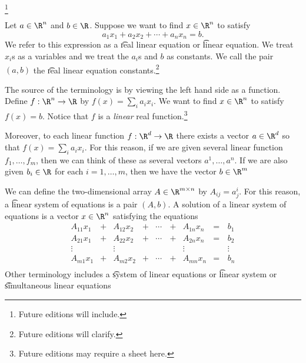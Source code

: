 
\footnote{Future editions will include.}


Let $a \in \R^n$ and $b \in \R$.
Suppose we want to find $x \in \R^n$ to satisfy
\[
  a_1x_1 + a_2x_2 + \cdots + a_nx_n = b.
\]
We refer to this expression as a \t{real linear equation} or \t{linear equation}.
We treat $x_i$s as a variables and we treat the $a_i$s and $b$ as constants.
We call the pair $(a, b)$ the \t{real linear equation constants}.\footnote{Future editions will clarify.}

The source of the terminology  is by viewing the left hand side as a function.
Define $f: \R^n \to \R$ by $f(x) = \sum_{i}a_ix_i$.
We want to find $x \in \R^n$ to satisfy $f(x) = b$.
Notice that $f$ is a \textit{linear} real function.\footnote{Future editions may require a sheet here.}

Moreover, to each linear function $f: \R^d \to \R$ there exists a vector $a \in \R^d$ so that $f(x) = \sum_{i} a_ix_i$.
For this reason, if we are given several linear function $f_1, \dots, f_m$, then we can think of these as several vectors $a^1, \dots, a^n$.
If we are also given $b_i \in \R$ for each $i = 1, \dots, m$, then we have the vector $b \in \R^m$

We can define the two-dimensional array $A \in \R^{m \times n}$ by $A_{ij} = a^{i}_j$.
For this reason, a \t{linear system of equations} is a pair $(A, b)$.
A solution of a linear system of equations is a vector $x \in \R^n$ satisfying the equations
\[
  \begin{aligned}
    A_{11}x_1 & + & A_{12}x_2 & + & \cdots \, & + & A_{1n}x_n & = \, & b_1 \\
    A_{21}x_1 & + & A_{22}x_2 & + & \cdots & + & A_{2n}x_n & = & b_2 \\
    \vdots    &   & \vdots    &   &        &   & \vdots    &   & \vdots \\
    A_{m1}x_1 & + & A_{m2}x_2 & + & \cdots & + & A_{mn}x_n & = & b_n \\
  \end{aligned}
\]
Other terminology includes a \t{system of linear equations} or \t{linear system} or \t{simultaneous linear equations}

\blankpage
